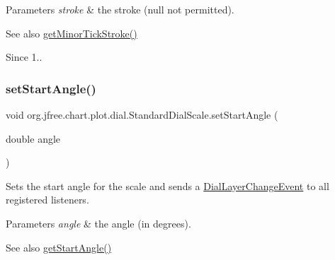 \begin{DoxyParams}{Parameters}
{\em stroke} & the stroke ({\ttfamily null} not permitted).\\
\hline
\end{DoxyParams}
\begin{DoxySeeAlso}{See also}
\mbox{\hyperlink{classorg_1_1jfree_1_1chart_1_1plot_1_1dial_1_1_standard_dial_scale_ae0bf68d6ba42c669e91a13992976284e}{get\+Minor\+Tick\+Stroke()}}
\end{DoxySeeAlso}
\begin{DoxySince}{Since}
1.. 
\end{DoxySince}
\mbox{\label{classorg_1_1jfree_1_1chart_1_1plot_1_1dial_1_1_standard_dial_scale_a7ecdab2cc09f48852e955c53e66d1671}} 
\subsubsection{\texorpdfstring{set\+Start\+Angle()}{setStartAngle()}}
{\footnotesize\ttfamily void org.\+jfree.\+chart.\+plot.\+dial.\+Standard\+Dial\+Scale.\+set\+Start\+Angle (\begin{DoxyParamCaption}\item[{double}]{angle }\end{DoxyParamCaption})}

Sets the start angle for the scale and sends a \mbox{\hyperlink{classorg_1_1jfree_1_1chart_1_1plot_1_1dial_1_1_dial_layer_change_event}{Dial\+Layer\+Change\+Event}} to all registered listeners.


\begin{DoxyParams}{Parameters}
{\em angle} & the angle (in degrees).\\
\hline
\end{DoxyParams}
\begin{DoxySeeAlso}{See also}
\mbox{\hyperlink{classorg_1_1jfree_1_1chart_1_1plot_1_1dial_1_1_standard_dial_scale_a89929cd8cb1353ecd67b765bd81a75f7}{get\+Start\+Angle()}} 
\end{DoxySeeAlso}
\mbox{\label{classorg_1_1jfree_1_1chart_1_1plot_1_1dial_1_1_standard_dial_scale_a1c9ce1462e74db6a73a00b98214a975d}} 
